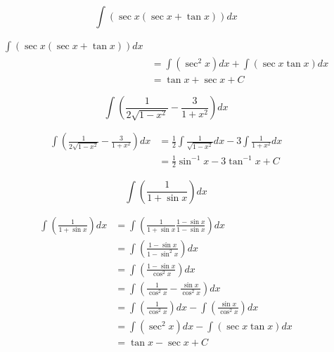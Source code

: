 \documentclass[a4paper, titlepage]{article}
\begin{document}
\begin{Exercise}
    \[\int \left( \sec x \left( \sec x + \tan x \right) \right) dx\]
\cite{anton-bivens-davis}
\end{Exercise}

\begin{Answer}
\begin{align*}
    \int \left( \sec x \left( \sec x + \tan x \right) \right) dx \\
    &= \int \left( \sec^2 x \right) dx + \int \left( \sec x \tan x \right) dx \\
    &= \tan x + \sec x + C
\end{align*}
\end{Answer}

\begin{Exercise}
    \[\int \left( \frac{1}{2 \sqrt{1 - x^2}} - \frac{3}{1 + x^2} \right) dx\]
\cite{anton-bivens-davis}
\end{Exercise}

\begin{Answer}
\begin{align*}
    \int \left( \frac{1}{2 \sqrt{1 - x^2}} - \frac{3}{1 + x^2} \right) dx
    &= \frac{1}{2} \int \frac{1}{\sqrt{1 - x^2}} dx
    - 3 \int \frac{1}{1 + x^2} dx \\
    &= \frac{1}{2} \sin^{-1} x - 3 \tan^{-1} x + C
\end{align*}
\end{Answer}

\begin{Exercise}
\[\int \left( \frac{1}{1 + \sin x} \right) dx\]
\cite{anton-bivens-davis}
\end{Exercise}

\begin{Answer}
\begin{align*}
    \int \left( \frac{1}{1 + \sin x} \right) dx
    &= \int \left( \frac{1}{1 + \sin x} \frac{1 - \sin x}{1 - \sin x} \right) dx \\
    &= \int \left( \frac{1 - \sin x}{1 - \sin^2 x} \right) dx \\
    &= \int \left( \frac{1 - \sin x}{\cos^2 x} \right) dx \\
    &= \int \left( \frac{1}{\cos^2 x} - \frac{\sin x}{\cos^2 x} \right) dx \\
    &= \int \left( \frac{1}{\cos^2 x} \right) dx - \int \left( \frac{\sin x}{\cos^2 x} \right) dx \\
    &= \int \left( \sec^2 x \right) dx - \int \left( \sec x \tan x \right) dx \\
    &= \tan x - \sec x + C
\end{align*}
\end{Answer}
\end{document}
